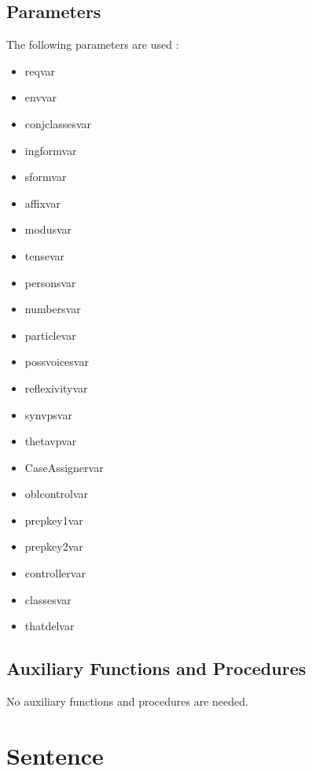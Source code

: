 \subsection{Parameters}
The following parameters are used :
\begin{itemize}
\item   reqvar           
\item   envvar           
\item   conjclassesvar   
\item   ingformvar       
\item   sformvar         
\item   affixvar         
\item   modusvar         
\item   tensevar         
\item   personsvar       
\item   numbersvar       
\item   particlevar      
\item   possvoicesvar    
\item   reflexivityvar   
\item   synvpsvar        
\item   thetavpvar       
\item   CaseAssignervar  
\item   oblcontrolvar    
\item   prepkey1var      
\item   prepkey2var      
\item   controllervar    
\item   classesvar       
\item   thatdelvar       
\end{itemize}
\subsection{Auxiliary Functions and Procedures}
No auxiliary functions and procedures are needed.
\section{Sentence}
